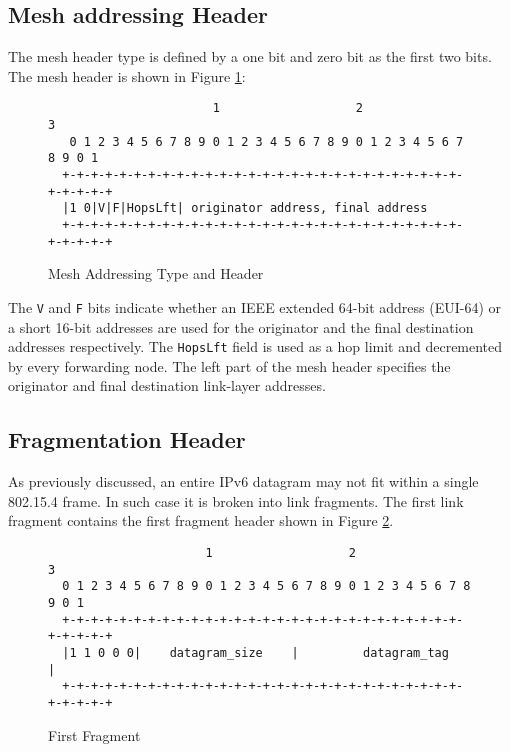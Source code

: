 \documentclass[12pt, titlepage, a4paper]{report}
\newenvironment{mylisting}
{\begin{list}{}{\setlength{\leftmargin}{1em}}\item\footnotesize}
{\end{list}}
\begin{document}
\subsection{Mesh addressing Header}\label{subsec:mesh.header}

The mesh header type is defined by a one bit and zero bit as the first two bits. The mesh header is shown in Figure \ref{fig:mesh.header}:
\begin{figure}[htp]
\centering
\begin{mylisting}
\begin{verbatim}
                       1                   2                   3
   0 1 2 3 4 5 6 7 8 9 0 1 2 3 4 5 6 7 8 9 0 1 2 3 4 5 6 7 8 9 0 1
  +-+-+-+-+-+-+-+-+-+-+-+-+-+-+-+-+-+-+-+-+-+-+-+-+-+-+-+-+-+-+-+-+
  |1 0|V|F|HopsLft| originator address, final address
  +-+-+-+-+-+-+-+-+-+-+-+-+-+-+-+-+-+-+-+-+-+-+-+-+-+-+-+-+-+-+-+-+
\end{verbatim}
\end{mylisting}
\caption{Mesh Addressing Type and Header}\label{fig:mesh.header}
\end{figure}

The \texttt{V} and \texttt{F} bits indicate whether an IEEE extended 64-bit address (EUI-64) or a short 16-bit addresses are used for the originator and the final destination addresses respectively. The \texttt{HopsLft} field is used as a hop limit and decremented by every forwarding node. The left part of the mesh header specifies the originator and final destination link-layer addresses.

\subsection{Fragmentation Header}\label{subsec:frag.header}
As previously discussed, an entire IPv6 datagram may not fit within a single 802.15.4 frame. In such case it is broken into link fragments. The first link fragment contains the first fragment header shown in Figure \ref{fig:first.fragment}.
\begin{figure}[htp]
\centering
\begin{mylisting}
\begin{verbatim}
                      1                   2                   3
  0 1 2 3 4 5 6 7 8 9 0 1 2 3 4 5 6 7 8 9 0 1 2 3 4 5 6 7 8 9 0 1
  +-+-+-+-+-+-+-+-+-+-+-+-+-+-+-+-+-+-+-+-+-+-+-+-+-+-+-+-+-+-+-+-+
  |1 1 0 0 0|    datagram_size    |         datagram_tag          |
  +-+-+-+-+-+-+-+-+-+-+-+-+-+-+-+-+-+-+-+-+-+-+-+-+-+-+-+-+-+-+-+-+
\end{verbatim}
\end{mylisting}
\caption{First Fragment}\label{fig:first.fragment}
\end{figure}
\end{document}
